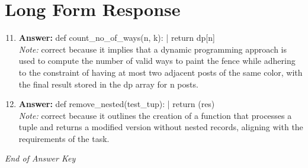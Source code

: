 \documentclass[12pt]{article}
\begin{document}
\section*{Long Form Response}
\begin{enumerate}[label=\arabic*.]
\setcounter{enumi}{10}
\item \textbf{Answer:} def count\_no\_of\_ways(n, k): | return dp[n]
\\ \textit{Note:} correct because it implies that a dynamic programming approach is used to compute the number of valid ways to paint the fence while adhering to the constraint of having at most two adjacent posts of the same color, with the final result stored in the dp array for n posts.
\item \textbf{Answer:} def remove\_nested(test\_tup): | return (res)
\\ \textit{Note:} correct because it outlines the creation of a function that processes a tuple and returns a modified version without nested records, aligning with the requirements of the task.
\end{enumerate}

\vfill
\noindent\textit{End of Answer Key}
\end{document}
